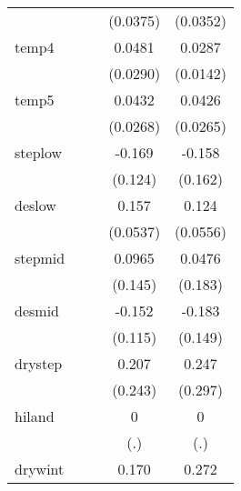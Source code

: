 {\begin{tabular}{l*{4}{c}}
            &                     &                     &    (0.0375)         &    (0.0352)         \\
[1em]
temp4       &                     &                     &      0.0481         &      0.0287\sym{*}  \\
            &                     &                     &    (0.0290)         &    (0.0142)         \\
[1em]
temp5       &                     &                     &      0.0432         &      0.0426         \\
            &                     &                     &    (0.0268)         &    (0.0265)         \\
[1em]
steplow     &                     &                     &      -0.169         &      -0.158         \\
            &                     &                     &     (0.124)         &     (0.162)         \\
[1em]
deslow      &                     &                     &       0.157\sym{**} &       0.124\sym{*}  \\
            &                     &                     &    (0.0537)         &    (0.0556)         \\
[1em]
stepmid     &                     &                     &      0.0965         &      0.0476         \\
            &                     &                     &     (0.145)         &     (0.183)         \\
[1em]
desmid      &                     &                     &      -0.152         &      -0.183         \\
            &                     &                     &     (0.115)         &     (0.149)         \\
[1em]
drystep     &                     &                     &       0.207         &       0.247         \\
            &                     &                     &     (0.243)         &     (0.297)         \\
[1em]
hiland      &                     &                     &           0         &           0         \\
            &                     &                     &         (.)         &         (.)         \\
[1em]
drywint     &                     &                     &       0.170         &       0.272         \\

\end{tabular}}
